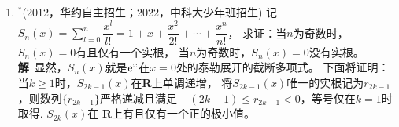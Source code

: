 \begin{enumerate}[label={【\textbf{例\thechapter.\arabic*}】},
 leftmargin=\inteval{\myenumleftmargin}pt,
 itemsep=\inteval{\myenumitempsep}pt,
 itemindent=\inteval{\myenumitemindent}pt]
\textbf{方法二}\ 不妨设$ x\leq a\leq b $，那么$ 0<x\leq 2 $. \\
I.当$ x+a\geq 7 $时，$ b\geq a\geq 5 $，那么
\begin{gather*}
    \dfrac{1}{\sqrt{1+x}}<1,\ \dfrac{1}{\sqrt{1+a}}+\dfrac{1}{\sqrt{1+b}}\leq
    \dfrac{2}{\sqrt{1+5}}<1
\end{gather*}
所以，$ f(x)=\dfrac{1}{\sqrt{1+x}}+\dfrac{1}{\sqrt{1+a}}+\dfrac{1}{\sqrt{1+b}}<2 $. \\
II.当$ x+a<7 $时，
\begin{gather*}
    \dfrac{1}{1+x}=1-\dfrac{x}{1+x}<1-\dfrac{x}{1+x}+\dfrac{x^2}{4(1+x)^2}=\left[
    1-\dfrac{x}{2(1+x)}\right]^2 \\
    \dfrac{1}{\sqrt{1+x}}<1-\dfrac{x}{2(1+x)}
\end{gather*}
同理可得：$ \dfrac{1}{\sqrt{1+a}}<1-\dfrac{a}{2(1+a)} $.于是，
\begin{align*}
    f(x)<2-\dfrac{1}{2}\left(\dfrac{x}{1+x}+\dfrac{a}{1+a}-
    2\sqrt{\dfrac{ax}{ax+8}}\right)
\end{align*}
又因为
\begin{align*}
    \dfrac{x}{1+x}+\dfrac{a}{1+a}\geq 2\sqrt{\dfrac{ax}{(1+x)(1+a)}}
    =2\sqrt{\dfrac{ax}{1+a+x+ax}}>2\sqrt{\dfrac{ax}{ax+8}}
\end{align*}
所以，$ f(x)<2 $成立。

事实上，结论可加强为$ 1<f(x)\leq \sqrt{3} $.当$ x=a=\dfrac{8}{ax}=2 $时，
$ f(x)=\sqrt{3} $. 证明过程参见脚注中的文献
\footnote{王品行.2008年高考数学江西理科卷压轴题之别解[J].中学数学研究,2008:24-25.\\ 
蒋明斌.一道西部数学奥林匹克赛题的溯源与推广[J].中学数学研究,2006:50-52.\\
吴善和.关于IMO42一个不等式的逆向[J].中学数学研究,2004:50-50}。
从高等数学角度来讲，实际上是研究二元函数$ F(x,a)=\dfrac{1}{\sqrt{1+x}}+
\dfrac{1}{\sqrt{1+a}}+\sqrt{\dfrac{ax}{ax+8}} $在$ x>0,a>0 $时的极值，
或者是三元函数$ G(x,a,b)=\dfrac{1}{\sqrt{1+x}}+\dfrac{1}{\sqrt{1+a}}+
\dfrac{1}{\sqrt{1+b}} $在约束条件$ xab=8 $下的极值，
可采用拉格朗日未定乘数法，然后求二重极限。

\item $ ^* $(2012，华约自主招生；2022，中科大少年班招生) 记$ S_n(x)=\sum\limits_{l=0}^{n}
\dfrac{x^l}{l!}=1+x+\dfrac{x^2}{2!}+\cdots+\dfrac{x^n}{n!} $，
求证：当$ n $为奇数时，$ S_n(x)=0 $有且仅有一个实根，
当$ n $为奇数时，$ S_n(x)=0 $没有实根。\\
\textbf{解}\ 显然，$ S_n(x) $就是$ \mathrm{e}^x $在$ x=0 $处的泰勒展开的截断多项式。
下面将证明：当$ k\geq 1 $时，$ S_{2k-1}(x) $在\textbf{R}上单调递增，
将$S_{2k-1}(x)$唯一的实根记为$ r_{2k-1}$，则数列$ \{r_{2k-1}\} $严格递减且满足
$ -(2k-1)\leq r_{2k-1} <0 $，等号仅在$ k=1 $时取得. $ S_{2k}(x) $在
\textbf{R}上有且仅有一个正的极小值。


\end{enumerate}
